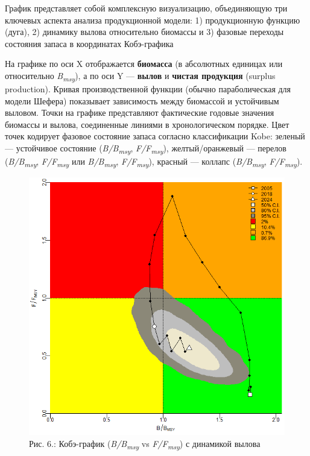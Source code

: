 \documentclass[
  letterpaper,
  DIV=11,
  numbers=noendperiod]{scrreprt}
\begin{document}
График представляет собой комплексную визуализацию, объединяющую три
ключевых аспекта анализа продукционной модели: 1) продукционную функцию
(дуга), 2) динамику вылова относительно биомассы и 3) фазовые переходы
состояния запаса в координатах Кобэ-графика

На графике по оси X отображается \textbf{биомасса} (в абсолютных
единицах или относительно \emph{B\textsubscript{msy}}), а по оси Y ---
\textbf{вылов} и \textbf{чистая продукция} (surplus production). Кривая
производственной функции (обычно параболическая для модели Шефера)
показывает зависимость между биомассой и устойчивым выловом. Точки на
графике представляют фактические годовые значения биомассы и вылова,
соединенные линиями в хронологическом порядке. Цвет точек кодирует
фазовое состояние запаса согласно классификации Kobe: зеленый ---
устойчивое состояние (\emph{B/B\textsubscript{msy}},
\emph{F/F\textsubscript{msy}}), желтый/оранжевый --- перелов
(\emph{B/B\textsubscript{msy}}, \emph{F/F\textsubscript{msy}} или
\emph{B/B\textsubscript{msy}}, \emph{F/F\textsubscript{msy}}), красный
--- коллапс (\emph{B/B\textsubscript{msy}},
\emph{F/F\textsubscript{msy}}).

\begin{figure}[H]

{\centering \includegraphics[width=0.6\linewidth,height=\textheight,keepaspectratio]{images/JABBA6.png}

}

\caption{Рис. 6.: Кобэ-график (\emph{B/B\textsubscript{msy}} vs
\emph{F/F\textsubscript{msy}}) с динамикой вылова}

\end{figure}%
\end{document}
